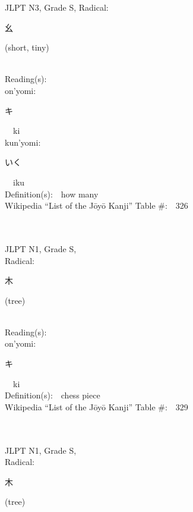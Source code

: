 \begin{multicols}{2}
{JLPT N3, Grade S, Radical:\ \ {\begin{CJK}{UTF8}{min} 幺 \end{CJK}} (short, tiny) } \\
Reading(s):\ \ \\
{\hspace*{1em}}on'yomi:\ \ \\
{\hspace*{2em}}{\begin{CJK}{UTF8}{min} キ \end{CJK}}\ \ ki\ \ \\
{\hspace*{1em}}kun'yomi:\ \ \\
{\hspace*{2em}}{\begin{CJK}{UTF8}{min} いく \end{CJK}}\ \ iku\ \ \\
Definition(s):\ \ how many \\
Wikipedia ``List of the J\=oy\=o Kanji'' Table \#:\ \ 326 \\
\ \ \\
{\fontsize{34pt}{40pt}  }\ \ \\
{JLPT N1, Grade S, \\Radical:\ \ {\begin{CJK}{UTF8}{min} 木 \end{CJK}} (tree) } \\
Reading(s):\ \ \\
{\hspace*{1em}}on'yomi:\ \ \\
{\hspace*{2em}}{\begin{CJK}{UTF8}{min} キ \end{CJK}}\ \ ki\ \ \\
Definition(s):\ \ chess piece \\
Wikipedia ``List of the J\=oy\=o Kanji'' Table \#:\ \ 329 \\
\ \ \\
{\fontsize{34pt}{40pt}  }\ \ \\
{JLPT N1, Grade S, \\Radical:\ \ {\begin{CJK}{UTF8}{min} 木 \end{CJK}} (tree) } \\

\end{multicols}
